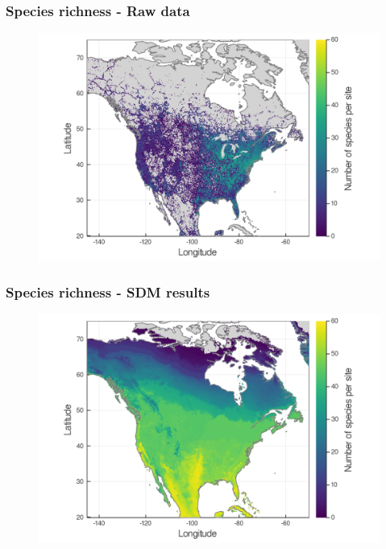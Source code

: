 \documentclass[10pt, aspectratio=1610]{beamer}
\begin{document}
\begin{frame}
  \frametitle{Species richness - Raw data}
  \begin{figure}
    \centering
    \hspace*{-0cm}\includegraphics[scale=0.20]{fig/03_raw_richness.png}
  \end{figure}
\end{frame}

\begin{frame}
  \frametitle{Species richness - SDM results}
  \begin{figure}
    \centering
    \hspace*{-0cm}\includegraphics[scale=0.20]{fig/03_sdm_richness.png}
  \end{figure}
\end{frame}
\end{document}
